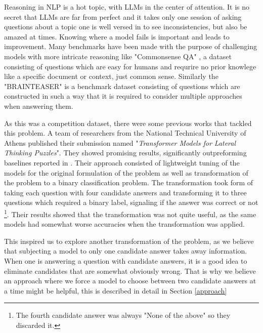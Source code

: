 Reasoning in NLP is a hot topic, with LLMs in the center of attention.  It is no secret that 
LLMs are far from perfect and it takes only one session of asking questions about a
topic one is well versed in to see inconsistencies, but also be amazed at times.  Knowing where
a model fails is important and leads to improvement.  Many benchmarks have been made with the
purpose of challenging models with more intricate reasoning like "Commonsense QA"
\citep{commonsenseQA}, a dataset consisting of questions which are easy for humans and requrire
no prior knowlege like a specific document or context, just common sense.  Similarly the "BRAINTEASER"
\citep{semeval} is a benchmark dataset consisting of questions which are constructed
in such a way that it is required to consider multiple approaches when answering them.

As this was a competition dataset, there were some previous works that tackled this problem. 
A team of researchers from the National Technical University of Athens published their submission
\citep{ails-lab} named "\textit{Transformer Models for Lateral Thinking Puzzles}".  They showed promising
results, significantly outpreforming baselines reported in \citep{semeval}. Their approach consisted
of lightweight tuning of the models for the original formulation of the problem as well as 
transformation of the problem to a binary classification problem.  The transformation took form of
taking each question with four candidate answers and transforming it to three questions which 
required a binary label, signaling if the answer was correct or not \footnote[2]{The fourth candidate
answer was always "None of the above" so they discarded it.}. Their results showed that the 
transformation was not quite useful, as the same models had somewhat worse accuracies when
the transformation was applied.  

This inspired us to explore another transformation of the problem, as we believe that subjecting
a model to only one candidate answer takes away information.  When one is answering a question
with candidate answers, it is a good idea to eliminate candidates that are somewhat obviously wrong.
That is why we believe an approach where we force a model to choose between two candidate answers
at a time might be helpful, this is described in detail in Section \ref{approach}

